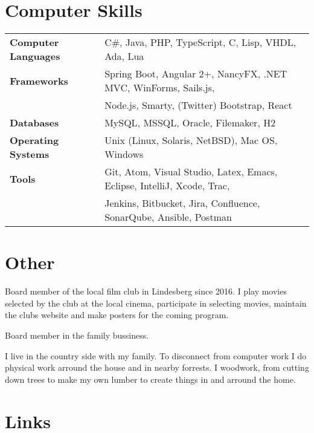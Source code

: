 \documentclass{cv-stylish}
\begin{document}
\begin{center}
\section{Computer Skills}

\begin{tabular}{ @{} >{\bfseries}l @{\hspace{6ex}} l }
Computer Languages & C\#, Java, PHP, TypeScript, C, Lisp, VHDL, Ada, Lua \\
Frameworks & Spring Boot, Angular 2+, NancyFX, .NET MVC, WinForms, Sails.js, \\
         & Node.js, Smarty, (Twitter) Bootstrap, React \\
Databases & MySQL, MSSQL, Oracle, Filemaker, H2 \\
Operating Systems & Unix (Linux, Solaris, NetBSD), Mac OS, Windows \\
Tools & Git, Atom, Visual Studio, Latex, Emacs, Eclipse, IntelliJ,
        Xcode, Trac, \\
      &  Jenkins, Bitbucket, Jira, Confluence, SonarQube, Ansible, Postman
\end{tabular}



\section{Other}

\begin{InfoBody}
Board member of the local film club in Lindesberg since 2016. I play
movies selected by the club at the local cinema, participate in
selecting movies, maintain the clubs website and make posters for the
coming program.

Board member in the family bussiness.

I live in the country side with my family. To disconnect from
computer work I do physical work arround the house and in nearby
forrests. I woodwork, from cutting down trees to make my own lumber to
create things in and arround the home.
\end{InfoBody}



\section{Links}
\begin{InfoBody}

 \hfill
{}

\end{InfoBody}

\end{center}
\end{document}
